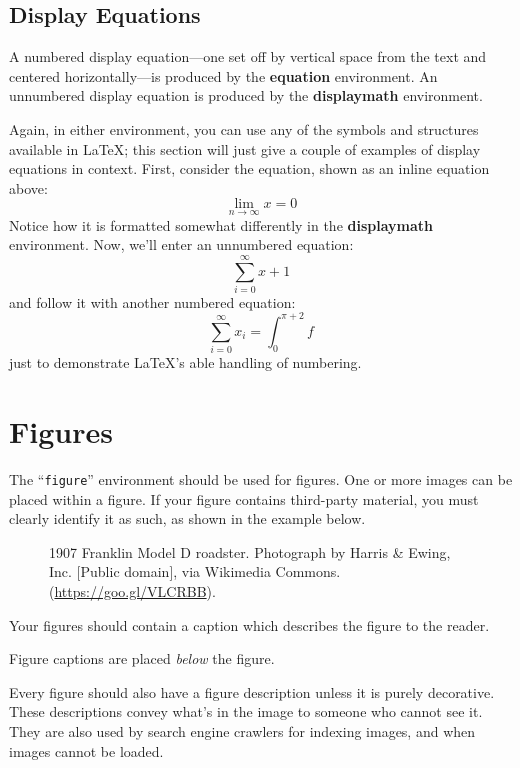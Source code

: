 \documentclass[sigconf,authordraft]{acmart}
\begin{document}
\subsection{Display Equations}
A numbered display equation---one set off by vertical space from the
text and centered horizontally---is produced by the \textbf{equation}
environment. An unnumbered display equation is produced by the
\textbf{displaymath} environment.

Again, in either environment, you can use any of the symbols and
structures available in \LaTeX\@; this section will just give a couple
of examples of display equations in context.  First, consider the
equation, shown as an inline equation above:
\begin{equation}
  \lim_{n\rightarrow \infty}x=0
\end{equation}
Notice how it is formatted somewhat differently in
the \textbf{displaymath}
environment.  Now, we'll enter an unnumbered equation:
\begin{displaymath}
  \sum_{i=0}^{\infty} x + 1
\end{displaymath}
and follow it with another numbered equation:
\begin{equation}
  \sum_{i=0}^{\infty}x_i=\int_{0}^{\pi+2} f
\end{equation}
just to demonstrate \LaTeX's able handling of numbering.

\section{Figures}

The ``\verb|figure|'' environment should be used for figures. One or
more images can be placed within a figure. If your figure contains
third-party material, you must clearly identify it as such, as shown
in the example below.
\begin{figure}[h]
  \centering
  \caption{1907 Franklin Model D roadster. Photograph by Harris \&
    Ewing, Inc. [Public domain], via Wikimedia
    Commons. (\url{https://goo.gl/VLCRBB}).}
\end{figure}

Your figures should contain a caption which describes the figure to
the reader.

Figure captions are placed {\itshape below} the figure.

Every figure should also have a figure description unless it is purely
decorative. These descriptions convey what’s in the image to someone
who cannot see it. They are also used by search engine crawlers for
indexing images, and when images cannot be loaded.
\end{document}
